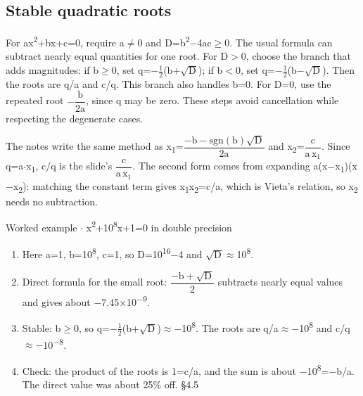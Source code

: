 \documentclass[11pt]{article}
\begin{document}
\begin{keepsection}
\begin{keepsection}
\subsection{Stable quadratic roots}

For ax\textsuperscript{2}+bx+c=0, require a\ensuremath{\neq}0 and D=b\textsuperscript{2}\ensuremath{-}4ac\ensuremath{\geq}0. The usual formula can subtract nearly equal quantities for one root. For D\ensuremath{>}0, choose the branch that adds magnitudes: if b\ensuremath{\geq}0, set q=\ensuremath{-}\ensuremath{\tfrac12}(b+\ensuremath{\sqrt{\mathrm{D}}}); if b\ensuremath{<}0, set q=\ensuremath{-}\ensuremath{\tfrac12}(b\ensuremath{-}\ensuremath{\sqrt{\mathrm{D}}}). Then the roots are q/a and c/q. This branch also handles b=0. For D=0, use the repeated root \ensuremath{-}{\small\ensuremath{\dfrac{\mathrm{b}}{2\mathrm{a}}}}, since q may be zero. These steps avoid cancellation while respecting the degenerate cases.

The notes write the same method as x\textsubscript{1}={\small\ensuremath{\dfrac{-\mathrm{b}-\text{sgn}(\mathrm{b})\sqrt{\mathrm{D}}}{2\mathrm{a}}}} and x\textsubscript{2}={\small\ensuremath{\dfrac{\mathrm{c}}{\mathrm{a}\, \mathrm{x}_{1}}}}. Since q=a\ensuremath{\cdot}x\textsubscript{1}, c/q is the slide’s {\small\ensuremath{\dfrac{\mathrm{c}}{\mathrm{a}\, \mathrm{x}_{1}}}}. The second form comes from expanding a(x\ensuremath{-}x\textsubscript{1})(x\ensuremath{-}x\textsubscript{2}): matching the constant term gives x\textsubscript{1}x\textsubscript{2}=c/a, which is Vieta’s relation, so x\textsubscript{2} needs no subtraction.

\begin{workedbox}{Worked example \ensuremath{\cdot} x\textsuperscript{2}+10\textsuperscript{8}x+1=0 in double precision}
\begin{enumerate}
\item Here a=1, b=10\textsuperscript{8}, c=1, so D=10\textsuperscript{16}\ensuremath{-}4 and \ensuremath{\sqrt{\mathrm{D}}}\ensuremath{\approx}10\textsuperscript{8}.
\item Direct formula for the small root: {\small\ensuremath{\dfrac{-\mathrm{b}+\sqrt{\mathrm{D}}}{2}}} subtracts nearly equal values and gives about \ensuremath{-}7.45\ensuremath{\times}10\textsuperscript{\ensuremath{-}9}.
\item Stable: b\ensuremath{\geq}0, so q=\ensuremath{-}\ensuremath{\tfrac12}(b+\ensuremath{\sqrt{\mathrm{D}}})\ensuremath{\approx}\ensuremath{-}10\textsuperscript{8}. The roots are q/a\ensuremath{\approx}\ensuremath{-}10\textsuperscript{8} and c/q\ensuremath{\approx}\ensuremath{-}10\textsuperscript{\ensuremath{-}8}.
\item Check: the product of the roots is 1=c/a, and the sum is about \ensuremath{-}10\textsuperscript{8}=\ensuremath{-}b/a. The direct value was about 25\% off. \hfill{\small\color{FAUblue}§4.5}
\end{enumerate}
\end{workedbox}


\end{keepsection}
\end{keepsection}
\end{document}
